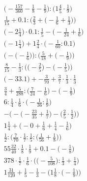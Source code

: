 \documentclass[8pt]{article}
\begin{document}
\begin{align}
\big(-\frac{157}{360} - \frac{1}{8} - \frac{1}{9}\big) : \big(1\frac{4}{5} \cdot \frac{1}{9}\big) \\
\frac{1}{15} + 0.1 : \Big(\frac{2}{3} + \big(-\frac{1}{6} + \frac{1}{3}\big)\Big) \\
\big(-2\frac{1}{4}\big) \cdot 0.1 : \frac{1}{5} - \big(-\frac{1}{24} + \frac{1}{6}\big) \\
\big(-1\frac{1}{4}\big) + 1\frac{2}{4} \cdot \big(-\frac{1}{60} : 0.1\big) \\
\Big(-\big(-\frac{1}{6}\big)\Big) : \Big(\frac{5}{18} + \big(-\frac{1}{9}\big)\Big) \\
\frac{8}{15} - \frac{1}{3} : \Big(\big(-\frac{2}{5}\big) - \big(-\frac{1}{5}\big)\Big) \\
\big(-33.1\big) + -\frac{3}{70} + \frac{3}{7} \cdot \frac{1}{3} \cdot \frac{1}{3} \\
\frac{3}{4} + \frac{5}{288} : \big(\frac{7}{24} - \frac{1}{6}\big) - \big(-\frac{1}{9}\big) \\
6 : \frac{1}{4} \cdot \frac{1}{6} \cdot \big(-\frac{1}{36} : \frac{1}{9}\big) \\
-\Big(-\big(-\frac{23}{35} + \frac{1}{7}\big) - \big(\frac{2}{5} \cdot \frac{1}{2}\big)\Big) \\
1\frac{1}{4} + \big(-0 + \frac{1}{6} + \frac{1}{4} - \frac{1}{6}\big) \\
\frac{1}{2} : \Big(\frac{7}{70} \cdot \frac{1}{7} : \frac{1}{5} : \big(\frac{1}{56} + \frac{1}{8}\big)\Big) \\
55\frac{32}{40} \cdot \frac{1}{8} \cdot \frac{1}{9} + 0.1 - \big(-\frac{1}{8}\big) \\
378 \cdot \frac{1}{7} \cdot \frac{1}{6} \cdot \Big(\big(-\frac{5}{108}\big) : \frac{1}{3} + \frac{1}{4}\Big) \\
1\frac{31}{120} + \frac{1}{5} - \frac{1}{3} - \Big(1\frac{1}{8} \cdot \big(-\frac{1}{9}\big)\Big)
\end{align}
\end{document}
